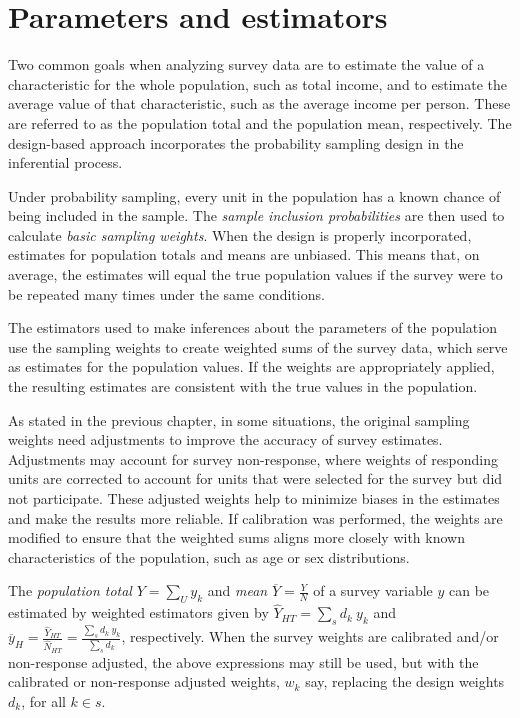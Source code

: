 \documentclass[
  12pt,
]{book}
\begin{document}
\hypertarget{parameters-and-estimators}{%
\section{Parameters and estimators}\label{parameters-and-estimators}}

Two common goals when analyzing survey data are to estimate the value of a characteristic for the whole population, such as total income, and to estimate the average value of that characteristic, such as the average income per person. These are referred to as the population total and the population mean, respectively. The design-based approach incorporates the probability sampling design in the inferential process.

Under probability sampling, every unit in the population has a known chance of being included in the sample. The \emph{sample inclusion probabilities} are then used to calculate \emph{basic sampling weights}. When the design is properly incorporated, estimates for population totals and means are unbiased. This means that, on average, the estimates will equal the true population values if the survey were to be repeated many times under the same conditions.

The estimators used to make inferences about the parameters of the population use the sampling weights to create weighted sums of the survey data, which serve as estimates for the population values. If the weights are appropriately applied, the resulting estimates are consistent with the true values in the population.

As stated in the previous chapter, in some situations, the original sampling weights need adjustments to improve the accuracy of survey estimates. Adjustments may account for survey non-response, where weights of responding units are corrected to account for units that were selected for the survey but did not participate. These adjusted weights help to minimize biases in the estimates and make the results more reliable. If calibration was performed, the weights are modified to ensure that the weighted sums aligns more closely with known characteristics of the population, such as age or sex distributions.

The \emph{population total} \(Y = \sum _{U} y_k\) and \emph{mean} \(\overline Y = \frac Y N\) of a survey variable \(y\) can be estimated by weighted estimators given by \(\widehat Y _{HT} = \sum _{s} d_k \ y_k\) and \(\overline y_{H} = \frac {\widehat Y_{HT}} {\widehat N_{HT}} = \frac {\sum_{s} d_k \ y_k} {\sum_{s} d_k}\), respectively. When the survey weights are calibrated and/or non-response adjusted, the above expressions may still be used, but with the calibrated or non-response adjusted weights, \(w_k\) say, replacing the design weights \(d_k\), for all \(k \in s\).
\end{document}

